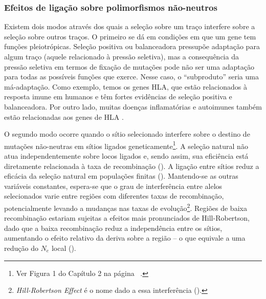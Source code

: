\begin{refsection}



\subsubsection{Efeitos de ligação sobre polimorfismos não-neutros}

Existem dois modos através dos quais a seleção sobre um traço interfere sobre a seleção sobre outros traços. O primeiro se dá em condições em que um gene tem funções pleiotrópicas. Seleção positiva ou balanceadora pressupõe adaptação para algum traço (aquele relacionado à pressão seletiva), mas a consequência da pressão seletiva em termos de fixação de mutações pode não ser uma adaptação para todas as possíveis funções que exerce. Nesse caso, o “subproduto” seria uma má-adaptação. Como exemplo, temos os genes HLA, que estão relacionados à resposta imune em humanos e têm fortes evidências de seleção positiva e balanceadora. Por outro lado, muitas doenças inflamatórias e autoimunes também estão relacionadas aos genes de HLA \parencite{Becker1998}.

O segundo modo ocorre quando o sítio selecionado interfere sobre o destino de mutações não-neutras em sítios ligados geneticamente\footnote{Ver Figura 1 do Capítulo 2 na página ~\pageref{fig:schema}.}. A seleção natural não atua independentemente sobre locos ligados e, sendo assim, sua eficiência está diretamente relacionada à taxa de recombinação (\cite{Hill2009,Comeron2008}). A ligação entre sítios reduz a eficácia da seleção natural em populações finitas (\cite{Hill2009,Comeron2008}). Mantendo-se as outras variáveis constantes, espera-se que o grau de interferência entre alelos selecionados varie entre regiões com diferentes taxas de recombinação, potencialmente levando a mudanças nas taxas de evolução\footnote{\emph{Hill-Robertson Effect} é o nome dado a essa interferência (\cite{Hill2009,Comeron2008}).}. Regiões de baixa recombinação estariam sujeitas a efeitos mais pronunciados de Hill-Robertson, dado que a baixa recombinação reduz a independência entre os sítios, aumentando o efeito relativo da deriva sobre a região -- o que equivale a uma redução do $N_{e}$ local (\cite{Maynard-Smith1974,Comeron2008}). %



\end{refsection}
